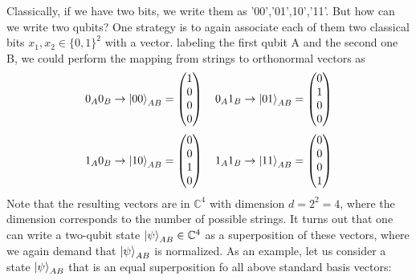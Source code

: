 Classically, if we have two bits, we write them as '00','01',10','11'. But how can we write two qubits? One strategy is to again associate each of them two classical bits $x_1,x_2 \in \{0,1\}^2$ with a vector. labeling the first qubit A and the second one B, we could perform the mapping from strings to orthonormal vectors as
\[
0_A0_B\rightarrow \ket{00}_{AB}=\begin{pmatrix} 1 \\0 \\0 \\ 0 \end{pmatrix} \quad 0_A1_B\rightarrow \ket{01}_{AB}=\begin{pmatrix} 0 \\ 1 \\ 0 \\ 0 \end{pmatrix}
\]
\[
1_A0_B\rightarrow \ket{10}_{AB}=\begin{pmatrix} 0 \\ 0 \\ 1 \\0 \end{pmatrix} \quad 1_A1_B\rightarrow \ket{11}_{AB}=\begin{pmatrix} 0 \\ 0 \\ 0 \\ 1 \end{pmatrix}
\]
Note that the resulting vectors are in $\mathbb{C}^4$ with dimension $d=2^2=4$, where the dimension corresponds to the number of possible strings. It turns out that one can write a two-qubit state $\ket{\psi}_{AB}\in\mathbb{C}^4$ as a superposition of these vectors, where we again demand that $\ket{\psi}_{AB}$ is normalized. As an example, let us consider a state $\ket{\psi}_{AB}$ that is an equal superposition fo all above standard basis vectors:
